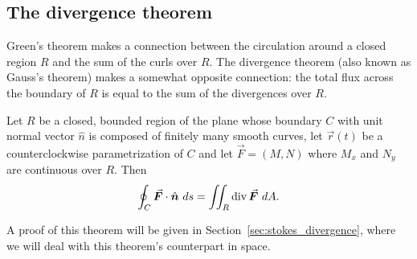 \subsection{The divergence theorem}


Green's theorem makes a connection between the circulation around a closed region $R$ and the sum of the curls over $R$. The divergence theorem (also known as Gauss's theorem) makes a somewhat opposite connection: the total flux across the boundary of $R$ is equal to the sum of the divergences over $R$. 



\begin{theorem}
\label{thm:divergence1}
Let $R$ be a closed, bounded region of the plane whose boundary $C$ with unit normal vector $\hat n$ is composed of finitely many smooth curves, let $\vec r(t)$ be a counterclockwise parametrization of $C$ and let $\vec F =\left( M,N\right)$ where $M_x$ and $N_y$ are continuous over $R$. Then
$$\oint_C \vec F\cdot \hat n\ ds = \iint_R\divv \vec F\ dA.$$
\end{theorem}

A proof of this theorem will be given in Section~\ref{sec:stokes_divergence}, where we will deal with this theorem's counterpart in space.

